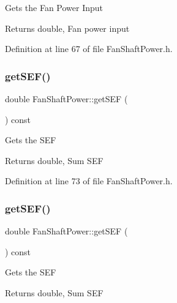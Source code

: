 Gets the Fan Power Input

\begin{DoxyReturn}{Returns}
double, Fan power input 
\end{DoxyReturn}


Definition at line 67 of file Fan\+Shaft\+Power.\+h.

\mbox{\label{class_fan_shaft_power_a7a36d22c2301d3c634fc89e103daa148}} 
\subsubsection{\texorpdfstring{get\+S\+E\+F()}{getSEF()}\hspace{0.1cm}{\footnotesize\ttfamily [1/3]}}
{\footnotesize\ttfamily double Fan\+Shaft\+Power\+::get\+S\+EF (\begin{DoxyParamCaption}{ }\end{DoxyParamCaption}) const\hspace{0.3cm}{\ttfamily [inline]}}

Gets the S\+EF

\begin{DoxyReturn}{Returns}
double, Sum S\+EF 
\end{DoxyReturn}


Definition at line 73 of file Fan\+Shaft\+Power.\+h.

\mbox{\label{class_fan_shaft_power_a7a36d22c2301d3c634fc89e103daa148}} 
\subsubsection{\texorpdfstring{get\+S\+E\+F()}{getSEF()}\hspace{0.1cm}{\footnotesize\ttfamily [2/3]}}
{\footnotesize\ttfamily double Fan\+Shaft\+Power\+::get\+S\+EF (\begin{DoxyParamCaption}{ }\end{DoxyParamCaption}) const\hspace{0.3cm}{\ttfamily [inline]}}

Gets the S\+EF

\begin{DoxyReturn}{Returns}
double, Sum S\+EF 
\end{DoxyReturn}


